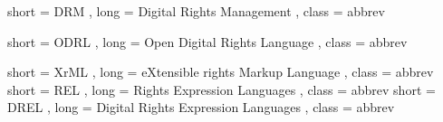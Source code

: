 {
  short = DRM ,
  long  = Digital Rights Management ,
  class = abbrev
}

{
  short = ODRL ,
  long  = Open Digital Rights Language ,
  class = abbrev
}

{
  short = XrML ,
  long  = eXtensible rights Markup Language ,
  class = abbrev
}
{
  short = REL ,
  long  = Rights Expression Languages ,
  class = abbrev
}
{
  short = DREL ,
  long  = Digital Rights Expression Languages ,
  class = abbrev
}
